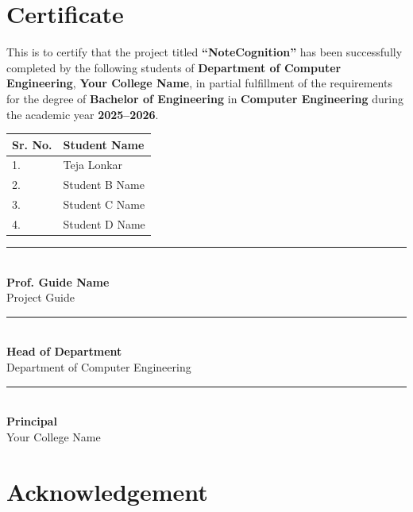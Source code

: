 \documentclass[12pt, a4paper, oneside]{report}
\newcommand{\projecttitle}{NoteCognition}
\newcommand{\collegename}{Your College Name}               %
\newcommand{\departmentname}{Department of Computer Engineering} %
\newcommand{\academicyear}{2025--2026}                     %
\newcommand{\guidename}{Prof. Guide Name}                  %
\newcommand{\studentA}{Teja Lonkar}                        %
\newcommand{\studentB}{Student B Name}                     %
\newcommand{\studentC}{Student C Name}                     %
\newcommand{\studentD}{Student D Name}                     %
\begin{document}
\chapter*{Certificate}

This is to certify that the project titled \textbf{``\projecttitle''} has been successfully completed by the following students of \textbf{\departmentname}, \textbf{\collegename}, in partial fulfillment of the requirements for the degree of \textbf{Bachelor of Engineering} in \textbf{Computer Engineering} during the academic year \textbf{\academicyear}.

\vspace{1cm}
\begin{tabular}{ll}
    \textbf{Sr. No.} & \textbf{Student Name} \\
    \midrule
    1. & \studentA \\
    2. & \studentB \\
    3. & \studentC \\
    4. & \studentD \\
\end{tabular}

\vspace{2cm}
\begin{minipage}[t]{0.45\textwidth}
    \centering
    \rule{6cm}{0.4pt}\\
    \textbf{\guidename}\\
    Project Guide
\end{minipage}
\hfill
\begin{minipage}[t]{0.45\textwidth}
    \centering
    \rule{6cm}{0.4pt}\\
    \textbf{Head of Department}\\
    \departmentname
\end{minipage}

\vspace{2cm}
\begin{center}
    \rule{6cm}{0.4pt}\\
    \textbf{Principal}\\
    \collegename
\end{center}

\chapter*{Acknowledgement}
\end{document}
